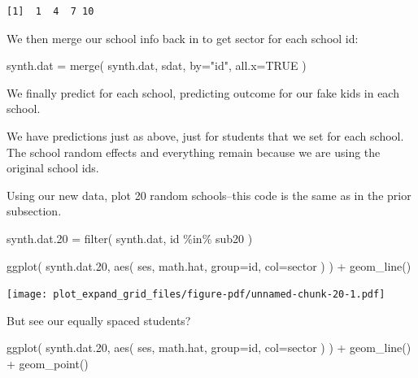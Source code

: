 \documentclass[
  letterpaper,
  DIV=11,
  numbers=noendperiod]{scrreprt}
\newenvironment{Shaded}{}{}
\newcommand{\AttributeTok}[1]{\textcolor[rgb]{0.49,0.56,0.16}{#1}}
\newcommand{\ConstantTok}[1]{\textcolor[rgb]{0.53,0.00,0.00}{#1}}
\newcommand{\FloatTok}[1]{\textcolor[rgb]{0.25,0.63,0.44}{#1}}
\newcommand{\FunctionTok}[1]{\textcolor[rgb]{0.02,0.16,0.49}{#1}}
\newcommand{\NormalTok}[1]{#1}
\newcommand{\OtherTok}[1]{\textcolor[rgb]{0.00,0.44,0.13}{#1}}
\newcommand{\SpecialCharTok}[1]{\textcolor[rgb]{0.25,0.44,0.63}{#1}}
\newcommand{\StringTok}[1]{\textcolor[rgb]{0.25,0.44,0.63}{#1}}
\begin{document}
\begin{verbatim}
[1]  1  4  7 10
\end{verbatim}

We then merge our school info back in to get sector for each school id:

\begin{Shaded}
\begin{Highlighting}[]
\NormalTok{synth.dat }\OtherTok{=} \FunctionTok{merge}\NormalTok{( synth.dat, sdat, }\AttributeTok{by=}\StringTok{"id"}\NormalTok{, }\AttributeTok{all.x=}\ConstantTok{TRUE}\NormalTok{ )}
\end{Highlighting}
\end{Shaded}

We finally predict for each school, predicting outcome for our fake kids
in each school.

\begin{Shaded}
\end{Shaded}

We have predictions just as above, just for students that we set for
each school. The school random effects and everything remain because we
are using the original school ids.

Using our new data, plot 20 random schools--this code is the same as in
the prior subsection.

\begin{Shaded}
\begin{Highlighting}[]
\NormalTok{synth.dat}\FloatTok{.20} \OtherTok{=} \FunctionTok{filter}\NormalTok{( synth.dat, id }\SpecialCharTok{\%in\%}\NormalTok{ sub20 )}

\FunctionTok{ggplot}\NormalTok{( synth.dat}\FloatTok{.20}\NormalTok{, }\FunctionTok{aes}\NormalTok{( ses, math.hat, }\AttributeTok{group=}\NormalTok{id, }\AttributeTok{col=}\NormalTok{sector ) ) }\SpecialCharTok{+}
  \FunctionTok{geom\_line}\NormalTok{()}
\end{Highlighting}
\end{Shaded}

\texttt{[image: plot\_expand\_grid\_files/figure-pdf/unnamed-chunk-20-1.pdf]}

But see our equally spaced students?

\begin{Shaded}
\begin{Highlighting}[]
\FunctionTok{ggplot}\NormalTok{( synth.dat}\FloatTok{.20}\NormalTok{, }\FunctionTok{aes}\NormalTok{( ses, math.hat, }\AttributeTok{group=}\NormalTok{id, }\AttributeTok{col=}\NormalTok{sector ) ) }\SpecialCharTok{+}
  \FunctionTok{geom\_line}\NormalTok{() }\SpecialCharTok{+}
  \FunctionTok{geom\_point}\NormalTok{()}
\end{Highlighting}
\end{Shaded}
\end{document}
